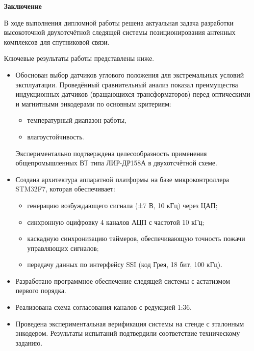 \newpage

\begin{center}
  \textbf{\large Заключение}
\end{center}

В ходе выполнения дипломной работы решена актуальная задача разработки высокоточной двухотсчётной следящей системы позиционирования антенных комплексов 
для спутниковой связи.

Ключевые результаты работы представлены ниже.
\begin{itemize}


\item Обоснован выбор датчиков углового положения для экстремальных условий эксплуатации. Проведённый сравнительный анализ показал 
преимущества индукционных датчиков (вращающихся трансформаторов) перед оптическими и магнитными энкодерами по  основным критериям:
  \begin{itemize}
      \item температурный диапазон работы,
      \item влагоустойчивость.
  \end{itemize}
  Экспериментально подтверждена целесообразность применения общепромышленных ВТ типа ЛИР-ДР158А в двухотсчётной схеме.

  \item Создана архитектура аппаратной платформы на базе микроконтроллера STM32F7, которая обеспечивает:
  \begin{itemize}
      \item генерацию возбуждающего сигнала (±7 В, 10 кГц) через ЦАП;
      \item синхронную оцифровку 4 каналов АЦП с частотой 10 кГц;
      \item каскадную синхронизацию таймеров, обеспечивающую точность пожачи управляющих сигналов;
      \item передачу данных по интерфейсу SSI (код Грея, 18 бит, 100 кГц).
  \end{itemize}

\item Разработано программное обеспечение следящей системы с астатизмом первого порядка. 

\item Реализована схема согласования каналов с редукцией 1:36. 

\item Проведена экспериментальная верификация системы на стенде с эталонным энкодером. 
Результаты испытаний подтвердили соответствие техническому заданию.

\end{itemize}


